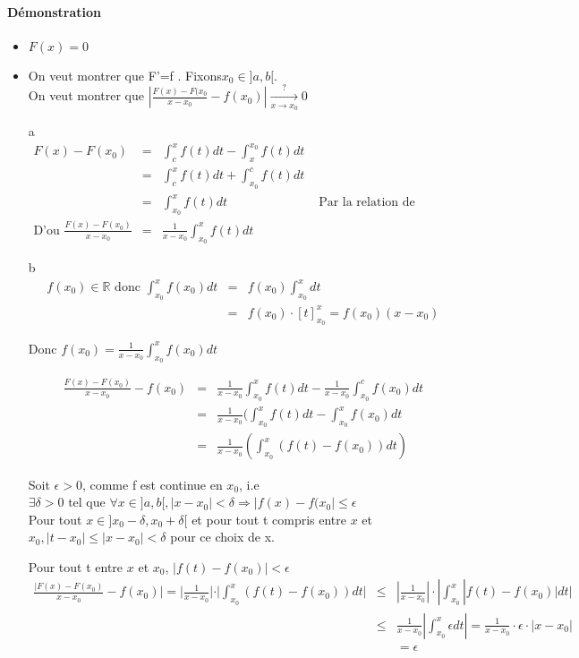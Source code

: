 \paragraph{Démonstration} 
\begin{itemize}
	\item $F(x) = 0$
	\item On veut montrer que F'=f . Fixons$x_0 \in ]a, b[$. ~\\On veut montrer que $|\frac{F(x) - F(x_0}{x-x_0} - f(x_0)| \xrightarrow[x \to x_0]{?} 0$ ~\\

	\item[a] \[\begin{array}{rclr}F(x) - F(x_0) &=& \int_c^x f(t)dt - \int_x^{x_0} f(t)dt \\
&=& \int_c^x f(t)dt + \int_{x_0}^c f(t)dt \\
&=& \int_{x_0}^x f(t)dt & \text{ Par la relation de Chasles} \\
\text{D'ou } \frac{F(x)-F(x_0)}{x-x_0} &=& \frac{1}{x-x_0} \int_{x_0}^x f(t)dt \end{array}\]

	\item[b] \[\begin{array}{rcl}
				f(x_0) \in \mathbb{R} \text{ donc } \int_{x_0}^x f(x_0)dt &=& f(x_0)\int_{x_0}^x dt \\
&=& f(x_0)\cdot {[t]}^x_{x_0} = f(x_0)(x-x_0) \end{array}\]

	Donc $f(x_0) = \frac{1}{x-x_0}\int_{x_0}^x f(x_0)dt$

	\[\begin{array}{rcl}
			\frac{F(x)-F(x_0)}{x-x_0} - f(x_0) &=& \frac{1}{x-x_0}\int^x_{x_0}f(t)dt - \frac{1}{x-x_0} \int_{x_0}^c f(x_0)dt \\
											&=& \frac{1}{x-x_0} (\int_{x_0}^x f(t)dt - \int_{x_0}^x f(x_0)dt \\
								   &=& \frac{1}{x-x_0} (\int_{x_0}^x (f(t) - f(x_0))dt)\end{array}\]

		Soit $\epsilon > 0$, comme f est continue en $x_0$, i.e $\exists \delta > 0 \text{ tel que } \forall x \in ]a, b[, |x-x_0| < \delta \Rightarrow |f(x)-f(x_0| \leq \epsilon$ ~\\
		Pour tout $x \in ]x_0-\delta, x_0+\delta[$ et pour tout t compris entre $x$ et $x_0, |t-x_0| \leq |x-x_0| < \delta$ pour ce choix de x.

			Pour tout t entre $x$ et $x_0$, $|f(t)-f(x_0)| < \epsilon$ \[\begin{array}{rcl}
				\frac{|F(x)-F(x_0)}{x-x_0} - f(x_0)| = |\frac{1}{x-x_0}|\cdot |\int_{x_0}^x (f(t)-f(x_0))dt| &\leq& |\frac{1}{x-x_0}|\cdot |\int_{x_0}^x |f(t)-f(x_0)|dt| \\
																		  &\leq& \frac{1}{x-x_0}|\int_{x_0}^x \epsilon dt| = \frac{1}{x-x_0} \cdot \epsilon\cdot |x-x_0| \\
																										  &&= \epsilon \end{array}\]
\end{itemize}

